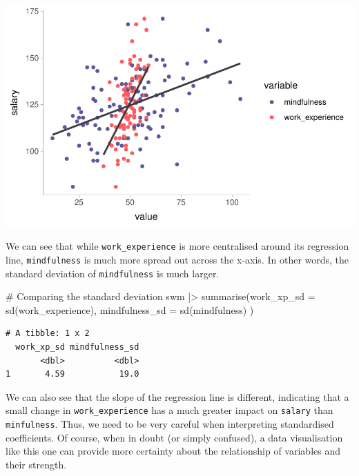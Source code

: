 \documentclass[
  letterpaper,
]{krantz}
\makeatletter
\newenvironment{Shaded}{\begin{snugshade}}{\end{snugshade}}
\newcommand{\AttributeTok}[1]{\textcolor[rgb]{0.40,0.45,0.13}{#1}}
\newcommand{\CommentTok}[1]{\textcolor[rgb]{0.37,0.37,0.37}{#1}}
\newcommand{\FunctionTok}[1]{\textcolor[rgb]{0.28,0.35,0.67}{#1}}
\newcommand{\NormalTok}[1]{\textcolor[rgb]{0.00,0.23,0.31}{#1}}
\newcommand{\SpecialCharTok}[1]{\textcolor[rgb]{0.37,0.37,0.37}{#1}}
\newenvironment{kframe}{%
\medskip{}
\setlength{\fboxsep}{.8em}
 \def\at@end@of@kframe{}%
 \ifinner\ifhmode%
  \def\at@end@of@kframe{\end{minipage}}%
  \begin{minipage}{\columnwidth}%
 \fi\fi%
 \def\FrameCommand##1{\hskip\@totalleftmargin \hskip-\fboxsep
 \colorbox{shadecolor}{##1}\hskip-\fboxsep
     \hskip-\linewidth \hskip-\@totalleftmargin \hskip\columnwidth}%
 \MakeFramed {\advance\hsize-\width
   \@totalleftmargin\z@ \linewidth\hsize
   \@setminipage}}%
 {\par\unskip\endMakeFramed%
 \at@end@of@kframe}
\renewenvironment{Shaded}{\begin{kframe}}{\end{kframe}}
\makeatother
\begin{document}
\includegraphics{13_regressions_files/figure-pdf/visualising-swm-regression-1.pdf}

We can see that while \texttt{work\_experience} is more centralised
around its regression line, \texttt{mindfulness} is much more spread out
across the x-axis. In other words, the standard deviation of
\texttt{mindfulness} is much larger.

\begin{Shaded}
\begin{Highlighting}[]
\CommentTok{\# Comparing the standard deviation}
\NormalTok{swm }\SpecialCharTok{|\textgreater{}}
  \FunctionTok{summarise}\NormalTok{(}\AttributeTok{work\_xp\_sd =} \FunctionTok{sd}\NormalTok{(work\_experience),}
            \AttributeTok{mindfulness\_sd =} \FunctionTok{sd}\NormalTok{(mindfulness)}
\NormalTok{            )}
\end{Highlighting}
\end{Shaded}

\begin{verbatim}
# A tibble: 1 x 2
  work_xp_sd mindfulness_sd
       <dbl>          <dbl>
1       4.59           19.0
\end{verbatim}

We can also see that the slope of the regression line is different,
indicating that a small change in \texttt{work\_experience} has a much
greater impact on \texttt{salary} than \texttt{minfulness}. Thus, we
need to be very careful when interpreting standardised coefficients. Of
course, when in doubt (or simply confused), a data visualisation like
this one can provide more certainty about the relationship of variables
and their strength.
\end{document}
